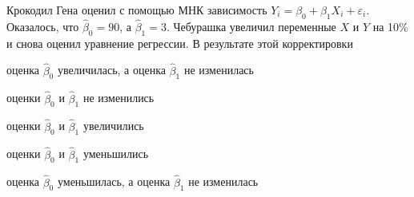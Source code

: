 
\begin{question}
Крокодил Гена оценил с помощью МНК зависимость
\(Y_i = \beta_0 + \beta_1 X_i + \varepsilon_i\). Оказалось, что
\(\hat \beta_0 = 90\), а \(\hat\beta_1 = 3\). Чебурашка увеличил
переменные \(X\) и \(Y\) на 10\% и снова оценил уравнение регрессии. В
результате этой корректировки
\begin{answerlist}
  \item оценка \(\hat\beta_0\) увеличилась, а оценка \(\hat\beta_1\) не
изменилась
  \item оценки \(\hat\beta_0\) и \(\hat\beta_1\) не изменились
  \item оценки \(\hat\beta_0\) и \(\hat\beta_1\) увеличились
  \item оценки \(\hat\beta_0\) и \(\hat\beta_1\) уменьшились
  \item оценка \(\hat\beta_0\) уменьшилась, а оценка \(\hat\beta_1\) не
изменилась
\end{answerlist}
\end{question}


